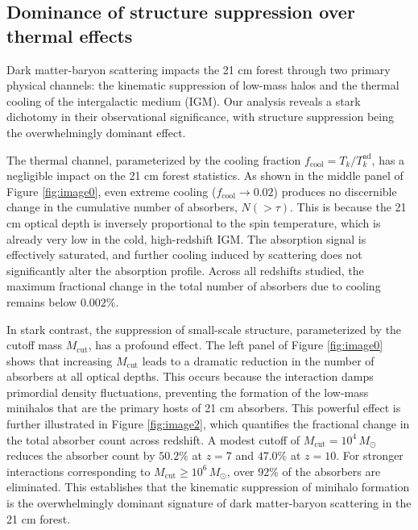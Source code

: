 \documentclass[]{article}
\begin{document}
\subsection{Dominance of structure suppression over thermal effects}

Dark matter-baryon scattering impacts the 21 cm forest through two primary physical channels: the kinematic suppression of low-mass halos and the thermal cooling of the intergalactic medium (IGM). Our analysis reveals a stark dichotomy in their observational significance, with structure suppression being the overwhelmingly dominant effect.

The thermal channel, parameterized by the cooling fraction $f_{\text{cool}} = T_k / T_k^{\text{ad}}$, has a negligible impact on the 21 cm forest statistics. As shown in the middle panel of Figure \ref{fig:image0}, even extreme cooling ($f_{\text{cool}} \to 0.02$) produces no discernible change in the cumulative number of absorbers, $N(>\tau)$. This is because the 21 cm optical depth is inversely proportional to the spin temperature, which is already very low in the cold, high-redshift IGM. The absorption signal is effectively saturated, and further cooling induced by scattering does not significantly alter the absorption profile. Across all redshifts studied, the maximum fractional change in the total number of absorbers due to cooling remains below $0.002\%$.

In stark contrast, the suppression of small-scale structure, parameterized by the cutoff mass $M_{\text{cut}}$, has a profound effect. The left panel of Figure \ref{fig:image0} shows that increasing $M_{\text{cut}}$ leads to a dramatic reduction in the number of absorbers at all optical depths. This occurs because the interaction damps primordial density fluctuations, preventing the formation of the low-mass minihalos that are the primary hosts of 21 cm absorbers. This powerful effect is further illustrated in Figure \ref{fig:image2}, which quantifies the fractional change in the total absorber count across redshift. A modest cutoff of $M_{\text{cut}} = 10^4 \, M_\odot$ reduces the absorber count by $50.2\%$ at $z=7$ and $47.0\%$ at $z=10$. For stronger interactions corresponding to $M_{\text{cut}} \ge 10^6 \, M_\odot$, over 92\% of the absorbers are eliminated. This establishes that the kinematic suppression of minihalo formation is the overwhelmingly dominant signature of dark matter-baryon scattering in the 21 cm forest.
\end{document}

